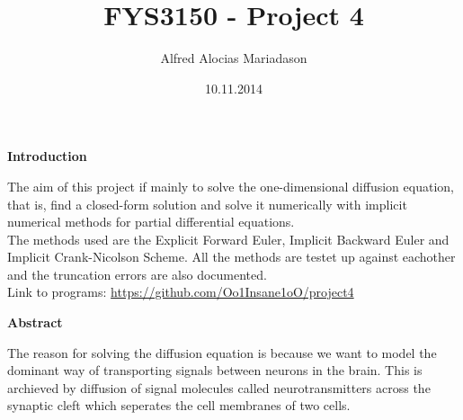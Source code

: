 \documentclass[a4paper,11pt]{article}
\title{FYS3150 - Project 4}
\author{Alfred Alocias Mariadason}
\date{10.11.2014}
\newcommand{\vsp}{\vspace{0.2cm}}
\newcommand{\secti}[1]{\begin{center} \Large\bf{{#1}} \end{center}}
\begin{document}
\maketitle
    
\secti{Introduction}
    The aim of this project if mainly to solve the one-dimensional diffusion equation, that is, find a closed-form solution and solve it numerically with implicit numerical methods for partial differential equations.\vsp\\
    The methods used are the Explicit Forward Euler, Implicit Backward Euler and Implicit Crank-Nicolson Scheme. All the methods are testet up against eachother and the truncation errors are also documented.\vsp\\
    Link to programs: \url{https://github.com/Oo1Insane1oO/project4}

\secti{Abstract}
    The reason for solving the diffusion equation is because we want to model the dominant way of transporting signals between neurons in the brain. This is archieved by diffusion of signal molecules called neurotransmitters across the synaptic cleft which seperates the cell membranes of two cells.
\end{document}
